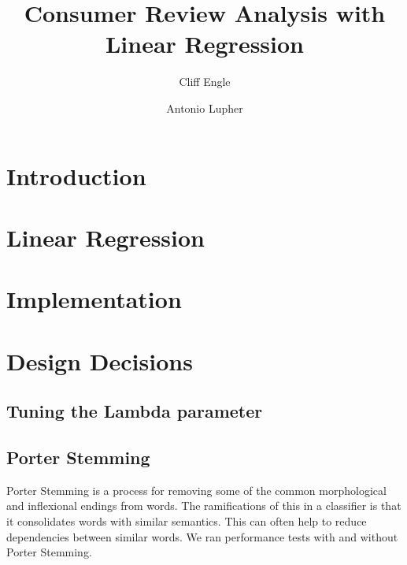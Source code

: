 \documentclass{article}
\title{Consumer Review Analysis with Linear Regression}
\author{Cliff Engle \and Antonio Lupher}
\begin{document}

\maketitle

\section{Introduction}


\section{Linear Regression}


\section{Implementation}

\section{Design Decisions}




\subsection{Tuning the Lambda parameter}

\subsection{Porter Stemming}
Porter Stemming is a process for removing some of the common morphological and inflexional endings from words. The ramifications of this in a classifier is that it consolidates words with similar semantics. This can often help to reduce dependencies between similar words. We ran performance tests with and without Porter Stemming. 
\end{document}
